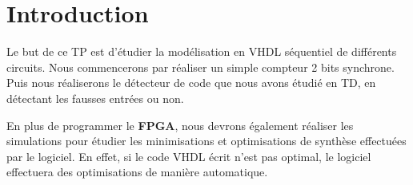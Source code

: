 \chapter{Introduction}

Le but de ce TP est d'étudier la modélisation en VHDL séquentiel de différents circuits. Nous commencerons par réaliser un simple compteur 2 bits synchrone. Puis nous réaliserons le détecteur de code que nous avons étudié en TD, en détectant les fausses entrées ou non.

\medskip

En plus de programmer le \textbf{FPGA}, nous devrons également réaliser les simulations pour étudier les minimisations et optimisations de synthèse effectuées par le logiciel. En effet, si le code VHDL écrit n'est pas optimal, le logiciel effectuera des optimisations de manière automatique.